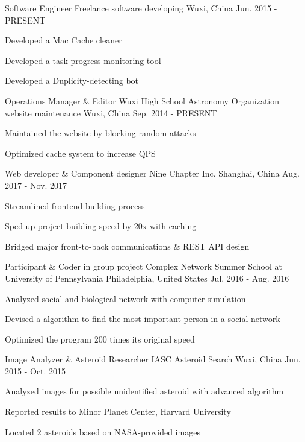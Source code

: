 \begin{cventries}
  \cventry
    {Software Engineer}
    {Freelance software developing}
    {Wuxi, China}
    {Jun. 2015 - PRESENT}
    {
      \begin{cvitems}
        \item {Developed a Mac Cache cleaner}
        \item {Developed a task progress monitoring tool}
        \item {Developed a Duplicity-detecting bot}
      \end{cvitems}
    }

  \cventry
    {Operations Manager \& Editor}
    {Wuxi High School Astronomy Organization website maintenance}
    {Wuxi, China}
    {Sep. 2014 - PRESENT}
    {
      \begin{cvitems}
        \item {Maintained the website by blocking random attacks}
        \item {Optimized cache system to increase QPS}
      \end{cvitems}
    }

  \cventry
    {Web developer \& Component designer}
    {Nine Chapter Inc.}
    {Shanghai, China}
    {Aug. 2017 - Nov. 2017}
    {
      \begin{cvitems}
        \item {Streamlined frontend building process}
        \item {Sped up project building speed by 20x with caching}
        \item {Bridged major front-to-back communications \& REST API design}
      \end{cvitems}
    }

  \cventry
    {Participant \& Coder in group project}
    {Complex Network Summer School at University of Pennsylvania}
    {Philadelphia, United States}
    {Jul. 2016 - Aug. 2016}
    {
      \begin{cvitems}
        \item {Analyzed social and biological network with computer simulation}
        \item {Devised a algorithm to find the most important person in a social network}
        \item {Optimized the program 200 times its original speed}
      \end{cvitems}
    }

  \cventry
    {Image Analyzer \& Asteroid Researcher}
    {IASC Asteroid Search}
    {Wuxi, China}
    {Jun. 2015 - Oct. 2015}
    {
      \begin{cvitems}
        \item {Analyzed images for possible unidentified asteroid with advanced algorithm}
        \item {Reported results to Minor Planet Center, Harvard University}
        \item {Located 2 asteroids based on NASA-provided images}
      \end{cvitems}
    }
\end{cventries}
